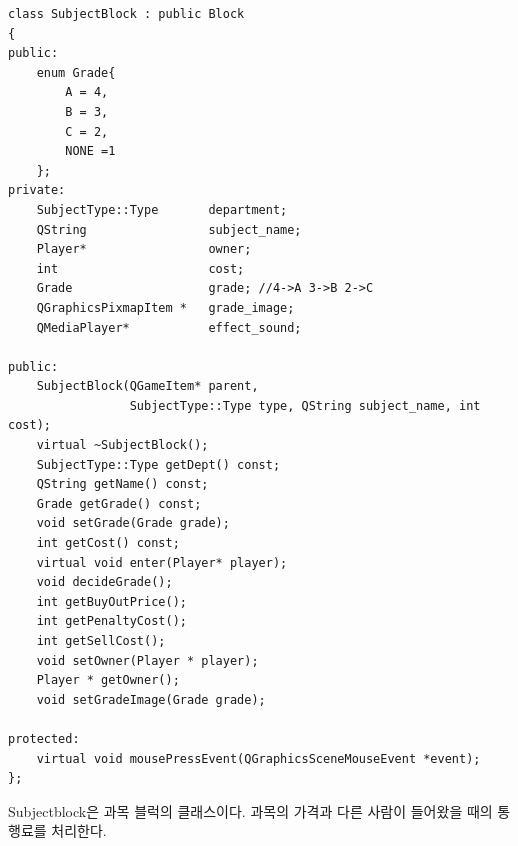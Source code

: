 \documentclass[10pt,oneside,a4paper,titlepage]{article}
\begin{document}
\begin{lstlisting}
class SubjectBlock : public Block
{
public:
    enum Grade{
        A = 4,
        B = 3,
        C = 2,
        NONE =1
    };
private:
    SubjectType::Type       department;
    QString                 subject_name;
    Player*                 owner;
    int                     cost;
    Grade                   grade; //4->A 3->B 2->C
    QGraphicsPixmapItem *   grade_image;
    QMediaPlayer*           effect_sound;

public:
    SubjectBlock(QGameItem* parent,
                 SubjectType::Type type, QString subject_name, int cost);
    virtual ~SubjectBlock();
    SubjectType::Type getDept() const;
    QString getName() const;
    Grade getGrade() const;
    void setGrade(Grade grade);
    int getCost() const;
    virtual void enter(Player* player);
    void decideGrade();
    int getBuyOutPrice(); 
    int getPenaltyCost(); 
    int getSellCost(); 
    void setOwner(Player * player);
    Player * getOwner();
    void setGradeImage(Grade grade);

protected:
    virtual void mousePressEvent(QGraphicsSceneMouseEvent *event);
};
\end{lstlisting}

Subjectblock은 과목 블럭의 클래스이다. 과목의 가격과 다른 사람이 들어왔을 때의 통행료를 처리한다.
\end{document}
